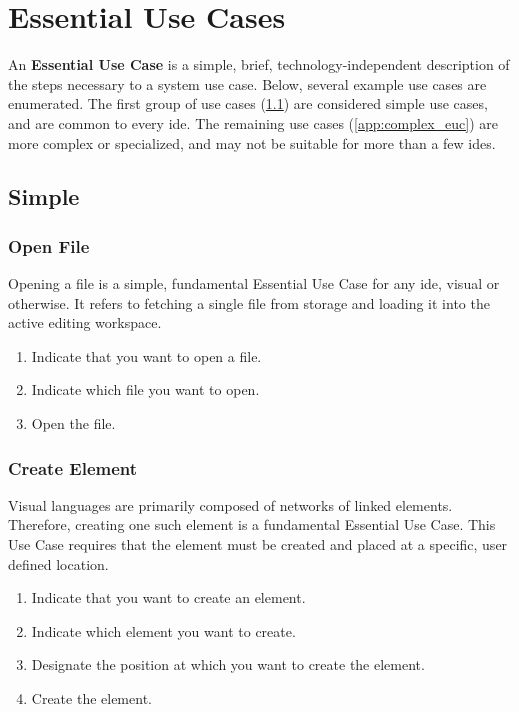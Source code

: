 \section{Essential Use Cases}
\label{app:euc}

An \textbf{Essential Use Case} is a simple, brief, technology-independent
description of the steps necessary to a system use case.
\cite{constantine1996} Below, several example use cases are enumerated. The
first group of use cases (\ref{app:simple_euc}) are considered simple use
cases, and are common to every \ac{ide}. The remaining use cases
(\ref{app:complex_euc}) are more complex or specialized, and may not be
suitable for more than a few \acp{ide}.

\subsection{Simple}
\label{app:simple_euc}

\subsubsection{Open File}
\label{app:euc_open}

Opening a file is a simple, fundamental Essential Use Case for any
\ac{ide}, visual or otherwise. It refers to fetching a single file from
storage and loading it into the active editing workspace.

\begin{enumerate}
  \item Indicate that you want to open a file.
  \item Indicate which file you want to open.
  \item Open the file.
\end{enumerate}

\subsubsection{Create Element}
\label{app:euc_create}

Visual languages are primarily composed of networks of linked elements.
Therefore, creating one such element is a fundamental Essential Use Case.
This Use Case requires that the element must be created and placed at a
specific, user defined location.

\begin{enumerate}
  \item Indicate that you want to create an element.
  \item Indicate which element you want to create.
  \item Designate the position at which you want to create the element.
  \item Create the element.
\end{enumerate}

